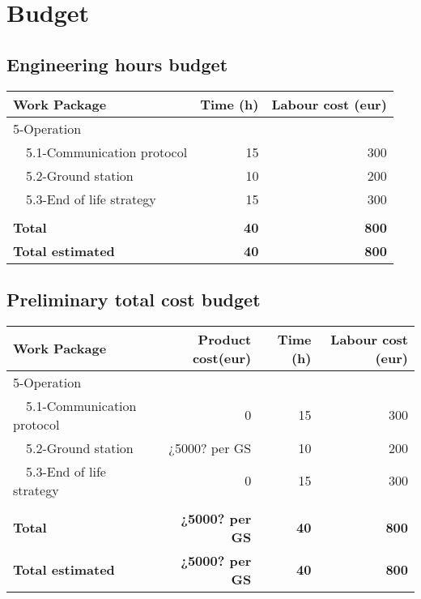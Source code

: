 \documentclass[12pt, titlepage]{article}
\begin{document}
\section{Budget}


\subsection{Engineering hours budget}
\begin{tabular}{ | l | r | r | }
\hline
Work Package & Time (h) & Labour cost (eur) \\ \hline
5-Operation &  &  \\ \hline
~~5.1-Communication protocol & 15 & 300 \\ \hline
~~5.2-Ground station & 10 & 200 \\ \hline
~~5.3-End of life strategy & 15& 300 \\ \hline
 &  &  \\ \hline
\textbf{Total} & \textbf{40} & \textbf{800} \\ \hline
\textbf{Total estimated} & \textbf{40} & \textbf{800} \\
\hline
\end{tabular}


\subsection{Preliminary total cost budget} 
\begin{tabular}{ | l | r | r | r | }
\hline
Work Package & Product cost(eur) & Time (h) & Labour cost (eur) \\ \hline
5-Operation &  &  &  \\ \hline
~~5.1-Communication protocol & 0 & 15 & 300 \\ \hline
~~5.2-Ground station & ¿5000? per GS & 10 & 200 \\ \hline
~~5.3-End of life strategy & 0 & 15& 300 \\ \hline
 &  &  &  \\ \hline
\textbf{Total} & \textbf{¿5000? per GS} & \textbf{40} & \textbf{800} \\ \hline
\textbf{Total estimated} & \textbf{¿5000? per GS} & \textbf{40} & \textbf{800} \\
\hline
\end{tabular}


\pagebreak


\end{document}
